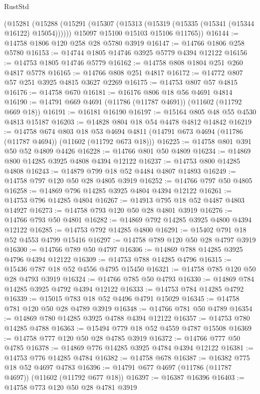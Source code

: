 \begin{lexlean}{RustStd}
\begin{coremodule}
    (@15281
      (@15288
        (@15291 (@15307 (@15313 (@15319 (@15335 (@15341 (@15344 @16122) @15054))))))
        @15097
        @15100
        @15103
        @15106
        @11765))
@16144 := @14758 @1806 @120 @258 @28 @5780 @3919
@16147 := @14766 @1806 @258 @5780
@16153 := @14744 @1805 @14746 @3925 @5779 @4394 @12122
@16156 := @14753 @1805 @14746 @5779
@16162 := @14758 @808 @1804 @251 @260 @4817 @5778
@16165 := @14766 @808 @251 @4817
@16172 := @14772 @807 @57 @251 @3925 @4815 @3627 @2269
@16175 := @14753 @807 @57 @4815
@16176 := @14758 @670
@16181 := @16176 @806 @18 @56 @4691 @4814
@16190 := @14791 @669 @4691 (@11786 (@11787 @4691)) (@11602 (@11792 @669 @18))
@16191 := @16181 @16190
@16197 := @15164 @805 @48 @55 @4530 @4813 @15187
@16203 := @14828 @804 @18 @54 @4478 @4812 @14842
@16219 := @14758
    @674
    @803
    @18
    @53
    @4694
    @4811
    (@14791 @673 @4694 (@11786 (@11787 @4694)) (@11602 (@11792 @673 @18)))
@16225 := @14758 @801 @391 @50 @52 @4809 @4426
@16228 := @14766 @801 @50 @4809
@16234 := @14869 @800 @14285 @3925 @4808 @4394 @12122
@16237 := @14753 @800 @14285 @4808
@16243 := @14879 @799 @18 @52 @4484 @4807 @14893
@16249 := @14758 @797 @120 @50 @28 @4805 @3919
@16252 := @14766 @797 @50 @4805
@16258 := @14869 @796 @14285 @3925 @4804 @4394 @12122
@16261 := @14753 @796 @14285 @4804
@16267 := @14913 @795 @18 @52 @4487 @4803 @14927
@16273 := @14758 @793 @120 @50 @28 @4801 @3919
@16276 := @14766 @793 @50 @4801
@16282 := @14869 @792 @14285 @3925 @4800 @4394 @12122
@16285 := @14753 @792 @14285 @4800
@16291 := @15402 @791 @18 @52 @4553 @4799 @15416
@16297 := @14758 @789 @120 @50 @28 @4797 @3919
@16300 := @14766 @789 @50 @4797
@16306 := @14869 @788 @14285 @3925 @4796 @4394 @12122
@16309 := @14753 @788 @14285 @4796
@16315 := @15436 @787 @18 @52 @4556 @4795 @15450
@16321 := @14758 @785 @120 @50 @28 @4793 @3919
@16324 := @14766 @785 @50 @4793
@16330 := @14869 @784 @14285 @3925 @4792 @4394 @12122
@16333 := @14753 @784 @14285 @4792
@16339 := @15015 @783 @18 @52 @4496 @4791 @15029
@16345 := @14758 @781 @120 @50 @28 @4789 @3919
@16348 := @14766 @781 @50 @4789
@16354 := @14869 @780 @14285 @3925 @4788 @4394 @12122
@16357 := @14753 @780 @14285 @4788
@16363 := @15494 @779 @18 @52 @4559 @4787 @15508
@16369 := @14758 @777 @120 @50 @28 @4785 @3919
@16372 := @14766 @777 @50 @4785
@16378 := @14869 @776 @14285 @3925 @4784 @4394 @12122
@16381 := @14753 @776 @14285 @4784
@16382 := @14758 @678
@16387 := @16382 @775 @18 @52 @4697 @4783
@16396 := @14791 @677 @4697 (@11786 (@11787 @4697)) (@11602 (@11792 @677 @18))
@16397 := @16387 @16396
@16403 := @14758 @773 @120 @50 @28 @4781 @3919

\end{coremodule}
\end{lexlean}
